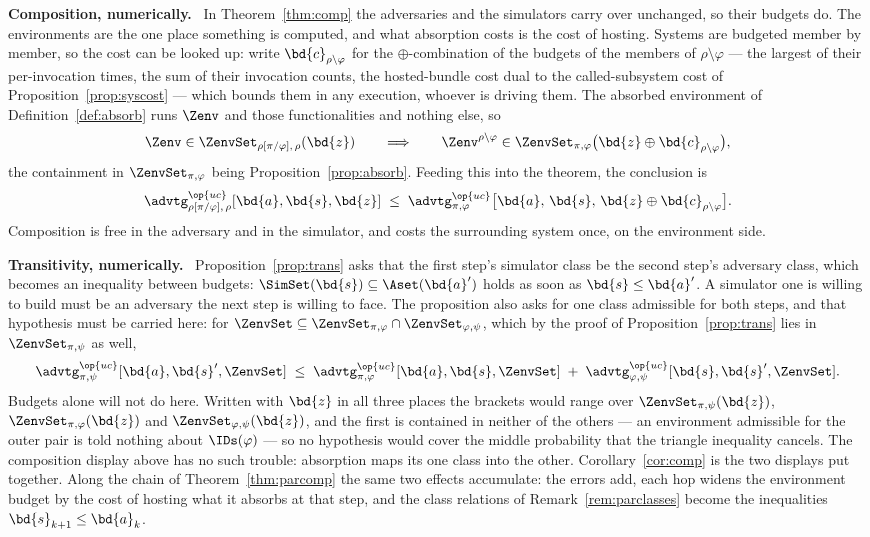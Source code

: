 \documentclass[10pt,oneside,openany]{book}
\newcommand{\heading}[1]{\medskip\par\noindent\textcolor{accent}{\textbf{#1.}}\ }
\theoremstyle{accentdef}
\theoremstyle{accentplain}
\begin{document}
\heading{Composition, numerically} In Theorem~\ref{thm:comp} the adversaries and the simulators
carry over unchanged, so their budgets do. The environments are the one place something is
computed, and what absorption costs is the cost of hosting. Systems are budgeted member by member, so the cost can be
looked up: write $\bd{c}_{\rho \setminus \varphi}$ for the $\oplus$-combination of the budgets of
the members of $\rho \setminus \varphi$ --- the largest of their per-invocation times, the sum of
their invocation counts, the hosted-bundle cost dual to the called-subsystem cost of
Proposition~\ref{prop:syscost} --- which bounds them in any execution, whoever is driving them. The
absorbed environment of Definition~\ref{def:absorb} runs
$\Zenv$ and those functionalities and nothing else, so
\[
  \Zenv \in \ZenvSet_{\rho[\pi/\varphi],\,\rho}(\bd{z})
  \qquad\Longrightarrow\qquad
  \Zenv^{\rho \setminus \varphi} \in \ZenvSet_{\pi,\varphi}\bigl(\bd{z} \oplus \bd{c}_{\rho \setminus \varphi}\bigr) ,
\]
the containment in $\ZenvSet_{\pi,\varphi}$ being Proposition~\ref{prop:absorb}. Feeding this
into the theorem, the conclusion is
\[
  \advtg^{\op{uc}}_{\rho[\pi/\varphi],\,\rho}[\bd{a},\bd{s},\bd{z}]
  \;\leq\;
  \advtg^{\op{uc}}_{\pi,\varphi}\bigl[\bd{a},\,\bd{s},\,\bd{z} \oplus \bd{c}_{\rho \setminus \varphi}\bigr] .
\]
Composition is free in the adversary and in the simulator, and costs the surrounding system
once, on the environment side.

\heading{Transitivity, numerically} Proposition~\ref{prop:trans} asks that the first step's
simulator class be the second step's adversary class, which becomes an inequality between
budgets: $\SimSet(\bd{s}) \subseteq \Aset(\bd{a}')$ holds as soon as $\bd{s} \leq \bd{a}'$. A
simulator one is willing to build must be an adversary the next step is willing to face. The
proposition also asks for one class admissible for both steps, and that hypothesis must be
carried here: for $\ZenvSet \subseteq \ZenvSet_{\pi,\varphi} \cap \ZenvSet_{\varphi,\psi}$, which
by the proof of Proposition~\ref{prop:trans} lies in $\ZenvSet_{\pi,\psi}$ as well,
\[
  \advtg^{\op{uc}}_{\pi,\psi}[\bd{a},\bd{s}',\ZenvSet]
  \;\leq\;
  \advtg^{\op{uc}}_{\pi,\varphi}[\bd{a},\bd{s},\ZenvSet]
  \;+\;
  \advtg^{\op{uc}}_{\varphi,\psi}[\bd{s},\bd{s}',\ZenvSet] .
\]
Budgets alone will not do here. Written with $\bd{z}$ in all three places the brackets would
range over $\ZenvSet_{\pi,\psi}(\bd{z})$, $\ZenvSet_{\pi,\varphi}(\bd{z})$ and
$\ZenvSet_{\varphi,\psi}(\bd{z})$, and the first is contained in neither of the others --- an
environment admissible for the outer pair is told nothing about $\IDs(\varphi)$ --- so no
hypothesis would cover the middle probability that the triangle inequality cancels. The
composition display above has no such trouble: absorption maps its one class into the other.
Corollary~\ref{cor:comp} is the two displays put together. Along the chain of
Theorem~\ref{thm:parcomp} the same two effects accumulate: the errors add, each hop widens the
environment budget by the cost of hosting what it absorbs at that step, and the class relations
of Remark~\ref{rem:parclasses} become the inequalities $\bd{s}_{k+1} \leq \bd{a}_k$.
\end{document}
